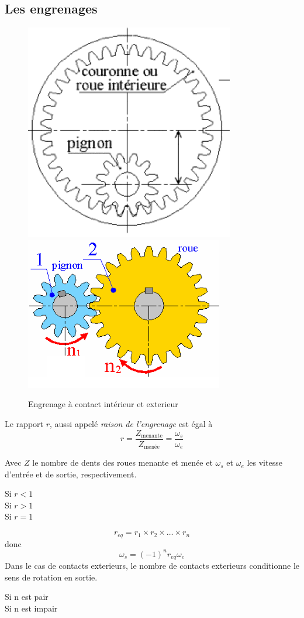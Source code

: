 \documentclass[10pt,fleqn]{article} %
\begin{document}
\subsection{Les engrenages}




\begin{figure}[h]
  \centering
  \includegraphics[width=.3\textwidth]{images/engre_interieur}
  \hfill
  \includegraphics[width=.4\textwidth]{images/engrenage_2_droit}
  \caption{Engrenage à contact intérieur et exterieur}
  \label{}
\end{figure}

\begin{definition}
  Le rapport $r$, aussi appelé \textit{raison de l'engrenage} est égal à $$r = \frac{Z_{\text{menante}}}{Z_{\text{menée}}} = \frac{\omega_s}{\omega_e}$$

  Avec $Z$ le nombre de dents des roues menante et menée et $\omega_s$ et $\omega_e$ les vitesse d'entrée et de sortie, respectivement.
\end{definition}

\begin{description}
  \item [Si $r<1$] 
  \item [Si $r>1$] 
  \item [Si $r=1$] 
\end{description}

\begin{aretenir}
  $$r_{eq} = r_1 \times r_2 \times \dots \times r_n $$
  donc
  $$\omega_s = (-1)^n r_{eq} \omega_e$$
  Dans le cas de contacts exterieurs, le nombre de contacts exterieurs conditionne le sens de rotation en sortie.
\begin{description}
  \item [Si n est pair] 
  \item [Si n est impair] 
\end{description}
\end{aretenir}
\end{document}
